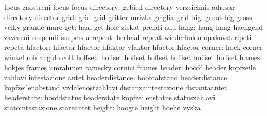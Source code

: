                            focus                     zaostreni
                           focus                     focus %
                directory: gebied                    directory
                           verzeichnis               adresar
                           directory                 director
                     grid: grid                      grid
                           gritter                   mrizka
                           griglia                   grid
                      big: groot                     big
                           gross                     velky
                           grande                    mare
                      get: haal                      get
                           hole                      ziskat
                           prendi                    adu
                     hang: hang                      hang
                           haengend                  zaveseni
                           sospendi                  suspenda
                   repeat: herhaal                   repeat
                           wiederholen               opakovat
                           ripeti                    repeta
                  hfactor: hfactor                   hfactor
                           hfaktor                   vfaktor
                           hfactor                   hfactor  %
                   corner: hoek                      corner
                           winkel                    roh
                           angolo                    colt
                  hoffset: hoffset                   hoffset
                           hoffset                   hoffset
                           hoffset                   hoffset %
                   frames: hokjes                    frames
                           umrahmen                  ramecky
                           cornici                   frames
                   header: hoofd                     header
                           kopfzeile                 zahlavi
                           intestazione              antet
           headerdistance: hoofdafstand              headerdistance
                           kopfzeilenabstand         vzdalenostzahlavi
                           distanzaintestazione      distantaantet
              headerstate: hoofdstatus               headerstate
                           kopfzeilenstatus          statuszahlavi
                           statointestazione         stareantet
                   height: hoogte                    height
                           hoehe                     vyska
